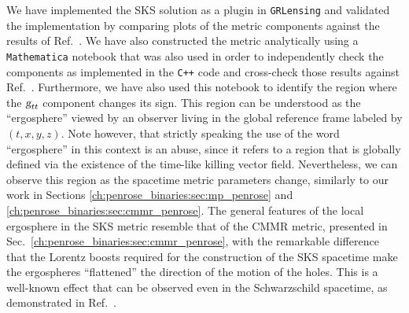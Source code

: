 We have implemented the SKS solution as a plugin in \texttt{GRLensing} and validated the implementation by comparing plots of the metric components against the results of Ref.~\cite{PhysRevD.104.044041}. We have also constructed the metric analytically using a \texttt{Mathematica} notebook that was also used in order to independently check the components as implemented in the \texttt{C++} code and cross-check those results against Ref.~\cite{PhysRevD.104.044041}. Furthermore, we have also used this notebook to identify the region where the $\mtrtens{t}{t}$ component changes its sign. This region can be understood as the ``ergosphere'' viewed by an observer living in the global reference frame labeled by $(t,x,y,z)$. Note however, that strictly speaking the use of the word ``ergosphere'' in this context is an abuse, since it refers to a region that is globally defined via the existence of the time-like killing vector field. Nevertheless, we can observe this region as the spacetime metric parameters change, similarly to our work in Sections \ref{ch:penrose_binaries:sec:mp_penrose} and \ref{ch:penrose_binaries:sec:cmmr_penrose}. The general features of the local ergosphere in the SKS metric resemble that of the CMMR metric, presented in Sec.~\ref{ch:penrose_binaries:sec:cmmr_penrose}, with the remarkable difference that the Lorentz boosts required for the construction of the SKS spacetime make the ergospheres ``flattened'' the direction of the motion of the holes. This is a well-known effect that can be observed even in the Schwarzschild spacetime, as demonstrated in Ref.~\cite{PhysRevD.91.084044}.